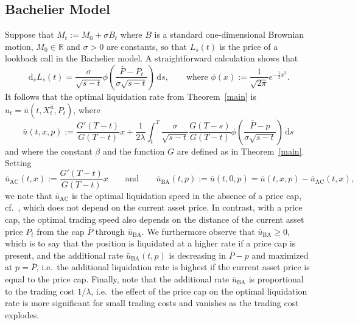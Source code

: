 \documentclass[11pt]{article}
\theoremstyle{definition}
\theoremstyle{remark}
\newcommand{\ts}{\textstyle}
\newcommand{\de}{\,\mathrm{d}}
\begin{document}
\subsection{Bachelier Model}
Suppose that $M_t:=M_0 + \sigma B_t$ where $B$ is a standard one-dimensional Brownian motion, $M_0\in\mathbb R$ and $ \sigma>0$ are constants, so that $L_s(t)$ is the price of a lookback call in the Bachelier model. A straightforward calculation shows that
\[
\de_s L_s(t) = \frac{\sigma}{\sqrt{s-t}}\phi\left(\frac{\bar{P}-P_t}{\sigma\sqrt{s-t}}\right)\de s,\qquad\text{where } \phi(x):=\frac{1}{\sqrt{2\pi}}e^{-\frac{1}{2}x^2}.
\]
It follows that the optimal liquidation rate from Theorem~\ref{main} is $\hat{u}_t = \bar{u}(t,X^{\hat{u}}_t,P_t)$, where
\begin{equation}\label{eqn:RateBachelier}
\bar{u}(t,x,p) := \frac{G'(T-t)}{G(T-t)} x +\frac{1}{2\lambda} \int_t^T \frac{\sigma}{\sqrt{s-t}} \frac{G(T-s)}{G(T-t)} \phi\left(\frac{\bar{P}-p}{\sigma\sqrt{s-t}}\right) \de s 
\end{equation}
and where the constant $\beta$ and the function $G$ are defined as in Theorem~\ref{main}. Setting
\[
 \bar{u}_{\mathrm{AC}}(t,x) := \frac{G'(T-t)}{G(T-t)} x\qquad\text{and}\qquad \bar{u}_{\mathrm{BA}}(t,p) := \bar{u}(t,0,p) = \bar{u}(t,x,p) -  \bar{u}_{\mathrm{AC}}(t,x),
\]
we note that $\bar{u}_{\mathrm{AC}}$ is the optimal liquidation speed in the absence of a price cap, cf.~\cite{almgren2001optimal}, which does not depend on the current asset price. In contrast, with a price cap, the optimal trading speed also depends on the distance of the current asset price $P_t$ from the cap $\bar{P}$ through $\bar{u}_{\mathrm{BA}}$. We furthermore observe that $\bar{u}_{\mathrm{BA}}\ge 0$, which is to say that the position is liquidated at a higher rate if a price cap is present, and the additional rate $\bar{u}_{\mathrm{BA}}(t,p)$ is decreasing in $\bar P-p$ and maximized at $p = \bar P$, i.e.\ the additional liquidation rate is highest if the current asset price is equal to the price cap. Finally, note that the additional rate $\bar{u}_{\mathrm{BA}}$ is proportional to the trading cost $1/\lambda$, i.e.\ the effect of the price cap on the optimal liquidation rate is more significant for small trading costs and vanishes as the trading cost explodes.
\end{document}
